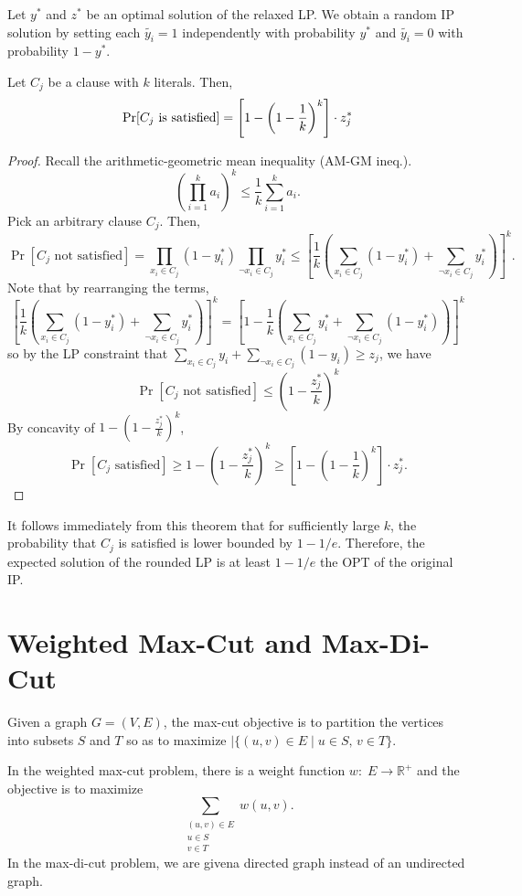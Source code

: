 Let $y^*$ and $z^*$ be an optimal solution of the relaxed LP. We obtain a random IP solution by setting each $\tilde{y_i} = 1$ independently with probability $y^*$ and $\tilde{y_i} = 0$ with probability $1 - y^*$.

\begin{theorem}
    Let $C_j$ be a clause with $k$ literals. Then,
    $$
    \Pr[\text{\normalfont $C_j$ is satisfied}] = \left[ 1 - \left( 1-\frac{1}{k} \right)^k \right] \cdot z_j^*
    $$
\end{theorem}

\begin{proof}
    Recall the arithmetic-geometric mean inequality (AM-GM ineq.).
    $$
    \left( \prod_{i=1}^k a_i \right)^k \leq \frac{1}{k} \sum_{i=1}^k a_i.
    $$
    Pick an arbitrary clause $C_j$. Then,
    $$
    \Pr[\text{$C_j$ not satisfied}] = \prod_{x_i \in C_j} (1 - y_i^*) \prod_{\neg x_i \in C_j} y_i^* \leq \left[ \frac{1}{k} \left( \sum_{x_i \in C_j} (1-y_i^*) + \sum_{\neg x_i \in C_j} y_i^* \right) \right]^{k}.
    $$
    Note that by rearranging the terms,
    $$
    \left[ \frac{1}{k} \left( \sum_{x_i \in C_j} (1-y_i^*) + \sum_{\neg x_i \in C_j} y_i^* \right) \right]^k =  \left[ 1 - \frac{1}{k} \left( \sum_{x_i \in C_j} y_i^* + \sum_{\neg x_i \in C_j} (1-y_i^*) \right) \right]^k
    $$
    so by the LP constraint that $\sum_{x_i \in C_j} y_i + \sum_{\neg x_i \in C_j} (1-y_i) \geq z_j$, we have
    $$
    \Pr[\text{$C_j$ not satisfied}] \leq \left( 1 - \frac{z_j^*}{k} \right)^k 
    $$
    By concavity of $1-(1 - \frac{z_j^*}{k})^k$,
    $$
    \Pr[\text{$C_j$ satisfied}] \geq 1 - \left( 1 - \frac{z_j^*}{k} \right)^k \geq \left[ 1 - \left( 1-\frac{1}{k} \right)^k \right] \cdot z_j^*.
    $$
\end{proof}

It follows immediately from this theorem that for sufficiently large $k$, the probability that $C_j$ is satisfied is lower bounded by $1 - 1/e$. Therefore, the expected solution of the rounded LP is at least $1 - 1/e$ the OPT of the original IP.

\section{Weighted Max-Cut and Max-Di-Cut}

Given a graph $G = (V,E)$, the max-cut objective is to partition the vertices into subsets $S$ and $T$ so as to maximize $|\{(u,v) \in E \mid u \in S,\, v \in T\}$.

In the weighted max-cut problem, there is a weight function $w:\; E \to \mathbb{R}^+$ and the objective is to maximize 
$$
\sum_{\substack{(u,v) \in E \\ u \in S \\ v \in T}} w(u,v).
$$
In the max-di-cut problem, we are givena directed graph instead of an undirected graph.

